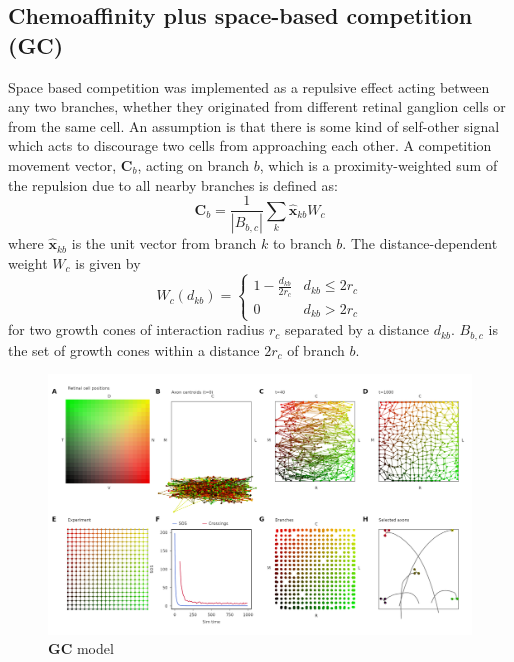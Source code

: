 \documentclass[11pt, a4paper]{article}
\begin{document}
\subsection*{Chemoaffinity plus space-based competition (GC)}

Space based competition was implemented as a repulsive effect acting between
any two branches, whether they originated from different retinal ganglion
cells or from the same cell. An assumption is that there is some kind of
self-other signal which acts to discourage two cells from approaching each
other. A competition movement vector, $\mathbf{C}_b$, acting on branch $b$,
which is a proximity-weighted sum of the repulsion due to all nearby branches
is defined as:
%
\begin{equation}
\mathbf{C}_b = \frac{1}{|B_{b,c}|} \sum_k \hat{\mathbf{x}}_{kb} W_c
\end{equation}
where $\hat{\mathbf{x}}_{kb}$ is the unit vector from branch $k$ to branch
$b$. The distance-dependent weight $W_c$ is given by
\begin{equation}
W_c(d_{kb}) = \begin{cases}
      1 - \frac{d_{kb}}{2r_c}   & d_{kb} \leq 2r_c \\
     0 & d_{kb} > 2r_c
     \end{cases}
\end{equation}
for two growth cones of interaction radius $r_c$ separated by a distance
$d_{kb}$. $B_{b,c}$ is the set of growth cones within a distance $2r_c$ of
branch $b$.

\begin{figure}
\includegraphics[width=\linewidth]{./images/j4_ee_GC_best_1_wt_figcomp1.png}
\caption{$\mathbf{GC}$ model}
\label{f:GC}
\end{figure}
\end{document}
